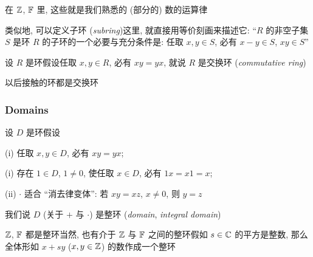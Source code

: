 \begin{example}
    在 $\mathbb{Z}$, $\mathbb{F}$ 里, 这些就是我们熟悉的 (部分的) 数的运算律\period
\end{example}

\begin{remark}
    类似地, 可以定义子环 (\textit{subring})\period 这里, 就直接用等价刻画来描述它: ``$R$ 的非空子集 $S$ 是环 $R$ 的子环的一个必要与充分条件是: 任取 $x,y \in S$, 必有 $x-y \in S$, $xy \in S$\period ''
\end{remark}

\begin{definition}
    设 $R$ 是环\period 假设任取 $x,y \in R$, 必有 $xy = yx$, 就说 $R$ 是交换环 (\textit{commutative ring})\period
\end{definition}

\begin{remark}
    以后接触的环都是交换环\period
\end{remark}

\subsubsection*{Domains}

\begin{definition}
    设 $D$ 是环\period 假设

    (i) 任取 $x,y \in D$, 必有 $xy = yx$;

    (i) 存在 $1 \in D$, $1 \neq 0$, 使任取 $x \in D$, 必有 $1x = x1 = x$;

    (ii) $\cdot$ 适合 ``消去律变体'': 若 $xy = xz$, $x \neq 0$, 则 $y = z$\period

    我们说 $D$ (关于 $+$ 与 $\cdot$) 是整环 (\textit{domain}, \textit{integral domain})\period
\end{definition}

\begin{example}
    $\mathbb{Z}$, $\mathbb{F}$ 都是整环\period 当然, 也有介于 $\mathbb{Z}$ 与 $\mathbb{F}$ 之间的整环\period 假如 $s \in \mathbb{C}$ 的平方是整数, 那么全体形如 $x + sy$ ($x,y \in \mathbb{Z}$) 的数作成一个整环\period
\end{example}

